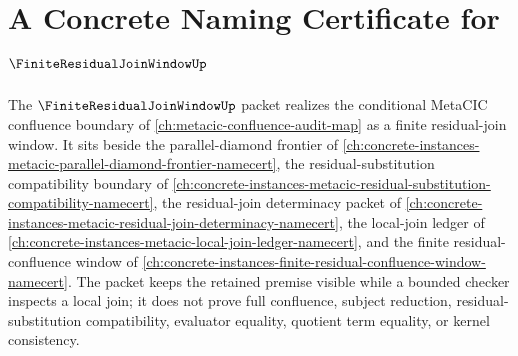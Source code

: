 \chapter{A Concrete Naming Certificate for $\FiniteResidualJoinWindowUp$}
\label{ch:concrete-instances-finite-residual-join-window-namecert}

The $\FiniteResidualJoinWindowUp$ packet realizes the conditional MetaCIC confluence boundary of \autoref{ch:metacic-confluence-audit-map} as a finite residual-join window. It sits beside the parallel-diamond frontier of \autoref{ch:concrete-instances-metacic-parallel-diamond-frontier-namecert}, the residual-substitution compatibility boundary of \autoref{ch:concrete-instances-metacic-residual-substitution-compatibility-namecert}, the residual-join determinacy packet of \autoref{ch:concrete-instances-metacic-residual-join-determinacy-namecert}, the local-join ledger of \autoref{ch:concrete-instances-metacic-local-join-ledger-namecert}, and the finite residual-confluence window of \autoref{ch:concrete-instances-finite-residual-confluence-window-namecert}. The packet keeps the retained premise visible while a bounded checker inspects a local join; it does not prove full confluence, subject reduction, residual-substitution compatibility, evaluator equality, quotient term equality, or kernel consistency.

